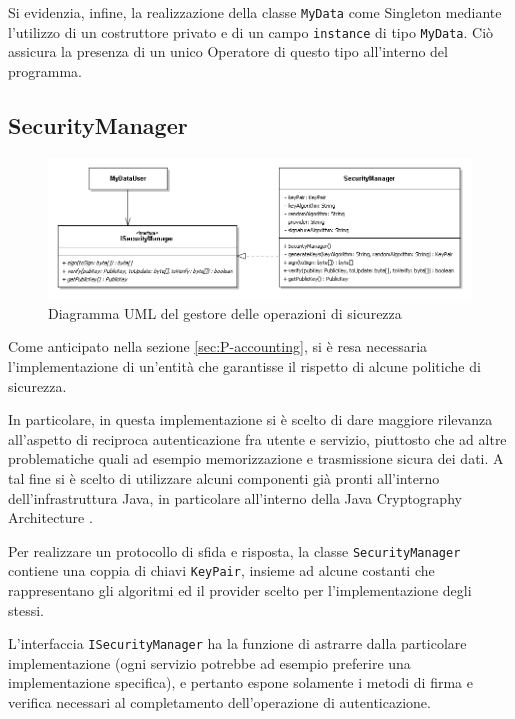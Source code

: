 Si evidenzia, infine, la realizzazione della classe \texttt{MyData} come Singleton mediante l’utilizzo di un costruttore privato e di un campo \texttt{instance} di tipo \texttt{MyData}. Ci\`o assicura la presenza di un unico Operatore di questo tipo all’interno del programma.

\subsection{SecurityManager}
\label{subsec:P-SecMan}
\begin{figure} [h]
	\includegraphics[width=\linewidth]{pictures/Accounting-SecurityManager.png}
	\caption{Diagramma UML del gestore delle operazioni di sicurezza}
	\label{fig:Accounting-SecurityManager}
\end{figure}
Come anticipato nella sezione \ref{sec:P-accounting}, si \`e resa necessaria l'implementazione di un'entit\`a che garantisse il rispetto di alcune politiche di sicurezza.

In particolare, in questa implementazione si \`e scelto di dare maggiore rilevanza all'aspetto di reciproca autenticazione fra utente e servizio, piuttosto che ad altre problematiche quali ad esempio memorizzazione e trasmissione sicura dei dati. A tal fine si \`e scelto di utilizzare alcuni componenti gi\`a pronti all'interno dell'infrastruttura Java, in particolare all'interno della Java Cryptography Architecture \cite{javacrypto}.

Per realizzare un protocollo di sfida e risposta, la classe \texttt{SecurityManager} contiene una coppia di chiavi \texttt{KeyPair}, insieme ad alcune costanti che rappresentano gli algoritmi ed il provider scelto per l'implementazione degli stessi.

L'interfaccia \texttt{ISecurityManager} ha la funzione di astrarre dalla particolare implementazione (ogni servizio potrebbe ad esempio preferire una implementazione specifica), e pertanto espone solamente i metodi di firma e verifica necessari al completamento dell'operazione di autenticazione.

